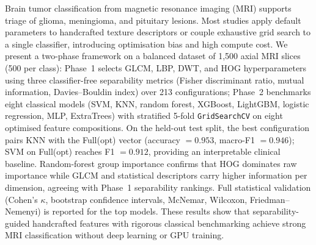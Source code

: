 Brain tumor classification from magnetic resonance imaging (MRI) supports triage of glioma, meningioma, and pituitary lesions.
Most studies apply default parameters to handcrafted texture descriptors or couple exhaustive grid search to a single classifier, introducing optimisation bias and high compute cost.
We present a two-phase framework on a balanced dataset of 1{,}500 axial MRI slices (500 per class): Phase~1 selects GLCM, LBP, DWT, and HOG hyperparameters using three classifier-free separability metrics (Fisher discriminant ratio, mutual information, Davies--Bouldin index) over 213 configurations; Phase~2 benchmarks eight classical models (SVM, KNN, random forest, XGBoost, LightGBM, logistic regression, MLP, ExtraTrees) with stratified 5-fold \texttt{GridSearchCV} on eight optimised feature compositions.
On the held-out test split, the best configuration pairs KNN with the Full(opt) vector (accuracy $=0.953$, macro-F1 $=0.946$); SVM on Full(opt) reaches F1 $=0.912$, providing an interpretable clinical baseline.
Random-forest group importance confirms that HOG dominates raw importance while GLCM and statistical descriptors carry higher information per dimension, agreeing with Phase~1 separability rankings.
Full statistical validation (Cohen's $\kappa$, bootstrap confidence intervals, McNemar, Wilcoxon, Friedman--Nemenyi) is reported for the top models.
These results show that separability-guided handcrafted features with rigorous classical benchmarking achieve strong MRI classification without deep learning or GPU training.
